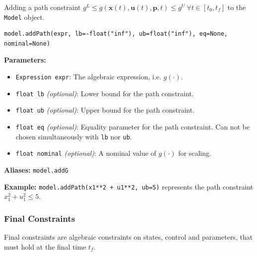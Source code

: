 \documentclass[12pt]{article}
\renewcommand{\v}{\bm}
\begin{document}
	\begin{mdframed}[backgroundcolor=gray!10, roundcorner=10pt, linewidth=1pt]
		
		Adding a path constraint ${g}^{L} \leq {g}(\v{x}(t), \v{u}(t), \v{p}, t) \leq {g}^{U}\ \forall t \in [t_0, t_f]$ to the \texttt{Model} object.
		
		\begin{lstlisting}
model.addPath(expr, lb=-float("inf"), ub=float("inf"), eq=None, nominal=None)
		\end{lstlisting}
		\label{addPath}
		\textbf{Parameters:}
		\begin{itemize}
			\item \texttt{Expression expr}: The algebraic expression, i.e. $g(\cdot)$.
			\item \texttt{float lb} \emph{(optional)}: Lower bound for the path constraint.
			\item \texttt{float ub} \emph{(optional)}: Upper bound for the path constraint.
			\item \texttt{float eq} \emph{(optional)}: Equality parameter for the path constraint. Can not be chosen simultaneously with \texttt{lb} nor \texttt{ub}.
			\item \texttt{float nominal} \emph{(optional)}: A nominal value of $g(\cdot)$ for scaling.
		\end{itemize}
		
		\textbf{Aliases:}  \texttt{model.addG}
		
		\textbf{Example:} \texttt{model.addPath(x1**2 + u1**2, ub=5)} represents the path constraint
		$x_1^2 + u_1^2 \leq 5$.
	\end{mdframed}
	
	
	\subsubsection{Final Constraints}
		
	Final constraints are algebraic constraints on states, control and parameters, that must hold at the final time $t_f$.
	
\end{document}
